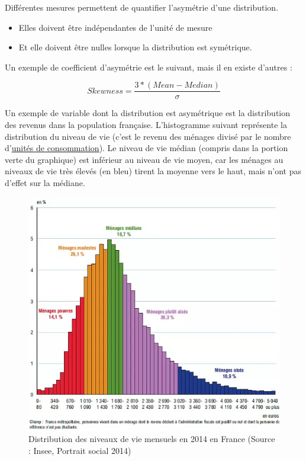 \documentclass[
]{book}
\providecommand{\tightlist}{%
  \setlength{\itemsep}{0pt}\setlength{\parskip}{0pt}}
\begin{document}
Différentes mesures permettent de quantifier l'asymétrie d'une distribution.

\begin{itemize}
\tightlist
\item
  Elles doivent être indépendantes de l'unité de mesure
\item
  Et elle doivent être nulles lorsque la distribution est symétrique.
\end{itemize}

Un exemple de coefficient d'asymétrie est le suivant, mais il en existe d'autres :

\[ Skewness = \frac{3*(Mean - Median)}{\sigma} \]

Un exemple de variable dont la distribution est asymétrique est la distribution des revenus dans la population française. L'histogramme suivant représente la distribution du niveau de vie (c'est le revenu des ménages divisé par le nombre d'\href{https://www.insee.fr/fr/metadonnees/definition/c1890}{unités de consommation}). Le niveau de vie médian (compris dans la portion verte du graphique) est inférieur au niveau de vie moyen, car les ménages au niveaux de vie très élevés (en bleu) tirent la moyenne vers le haut, mais n'ont pas d'effet sur la médiane.

\begin{figure}
\centering
\includegraphics{images/salaires - copie.jpg}
\caption{Distribution des niveaux de vie mensuels en 2014 en France (Source : Insee, Portrait social 2014)}
\end{figure}
\end{document}
